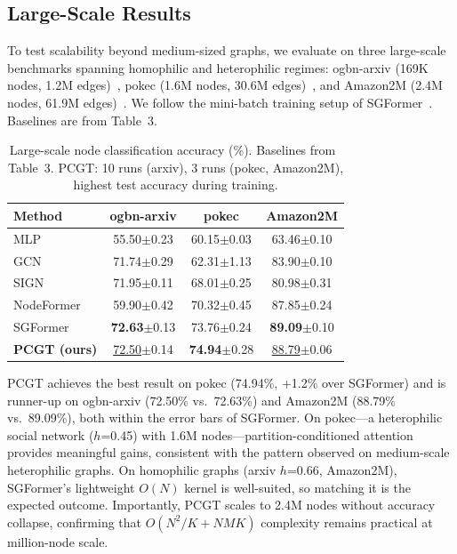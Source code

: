 \documentclass[sigconf]{acmart}
\newcommand{\best}[1]{\textcolor{bestcolor}{\textbf{#1}}}
\newcommand{\runup}[1]{\textcolor{runnerup}{\underline{#1}}}
\begin{document}
\subsection{Large-Scale Results}

To test scalability beyond medium-sized graphs, we evaluate on three large-scale benchmarks spanning homophilic and heterophilic regimes: ogbn-arxiv (169K nodes, 1.2M edges)~\citep{hu2020ogb}, pokec (1.6M nodes, 30.6M edges)~\citep{lim2021large}, and Amazon2M (2.4M nodes, 61.9M edges)~\citep{wu2022nodeformer}. We follow the mini-batch training setup of SGFormer~\citep{wu2023sgformer}. Baselines are from \citet{wu2023sgformer} Table~3.

\begin{table}[t]
\centering
\small
\begin{tabular}{l|ccc}
\toprule
\textbf{Method} & \textbf{ogbn-arxiv} & \textbf{pokec} & \textbf{Amazon2M} \\
\midrule
MLP & 55.50{\scriptsize$\pm$0.23} & 60.15{\scriptsize$\pm$0.03} & 63.46{\scriptsize$\pm$0.10} \\
GCN~\citep{kipf2017semi} & 71.74{\scriptsize$\pm$0.29} & 62.31{\scriptsize$\pm$1.13} & 83.90{\scriptsize$\pm$0.10} \\
SIGN~\citep{rossi2020sign} & 71.95{\scriptsize$\pm$0.11} & 68.01{\scriptsize$\pm$0.25} & 80.98{\scriptsize$\pm$0.31} \\
NodeFormer~\citep{wu2022nodeformer} & 59.90{\scriptsize$\pm$0.42} & 70.32{\scriptsize$\pm$0.45} & 87.85{\scriptsize$\pm$0.24} \\
SGFormer~\citep{wu2023sgformer} & \best{72.63}{\scriptsize$\pm$0.13} & 73.76{\scriptsize$\pm$0.24} & \best{89.09}{\scriptsize$\pm$0.10} \\
\midrule
\textbf{PCGT (ours)} & \runup{72.50}{\scriptsize$\pm$0.14} & \best{74.94}{\scriptsize$\pm$0.28} & \runup{88.79}{\scriptsize$\pm$0.06} \\
\bottomrule
\end{tabular}
\caption{Large-scale node classification accuracy (\%). Baselines from~\citet{wu2023sgformer} Table~3. PCGT: 10 runs (arxiv), 3 runs (pokec, Amazon2M), highest test accuracy during training.}
\label{tab:largescale}
\end{table}

\noindent PCGT achieves the best result on pokec (74.94\%, +1.2\% over SGFormer) and is runner-up on ogbn-arxiv (72.50\% vs.\ 72.63\%) and Amazon2M (88.79\% vs.\ 89.09\%), both within the error bars of SGFormer. On pokec---a heterophilic social network ($h$=0.45) with 1.6M nodes---partition-conditioned attention provides meaningful gains, consistent with the pattern observed on medium-scale heterophilic graphs. On homophilic graphs (arxiv $h$=0.66, Amazon2M), SGFormer's lightweight $O(N)$ kernel is well-suited, so matching it is the expected outcome. Importantly, PCGT scales to 2.4M nodes without accuracy collapse, confirming that $O(N^2/K + NMK)$ complexity remains practical at million-node scale.
\end{document}
